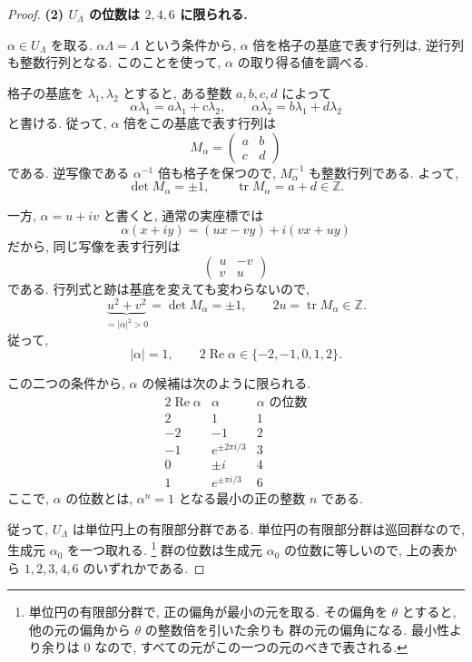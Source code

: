 \documentclass[dvipdfmx,a4paper,11pt]{article} %
\newcommand{\Z}{\mathbb{Z}}
\theoremstyle{definition}
\numberwithin{equation}{section}
\begin{document}
\begin{proof}
\medskip
\noindent
\textbf{(2) $U_\Lambda$ の位数は $2,4,6$ に限られる.}

$\alpha\in U_\Lambda$ を取る.
$\alpha\Lambda=\Lambda$ という条件から,
$\alpha$ 倍を格子の基底で表す行列は,
逆行列も整数行列となる.
このことを使って, $\alpha$ の取り得る値を調べる.

格子の基底を $\lambda_1,\lambda_2$ とすると,
ある整数 $a,b,c,d$ によって
\[
\alpha\lambda_1=a\lambda_1+c\lambda_2,\qquad
\alpha\lambda_2=b\lambda_1+d\lambda_2
\]
と書ける.
従って, $\alpha$ 倍をこの基底で表す行列は
\[
M_\alpha=
\begin{pmatrix}
a&b\\
c&d
\end{pmatrix}
\]
である.
逆写像である $\alpha^{-1}$ 倍も格子を保つので,
$M_\alpha^{-1}$ も整数行列である.
よって,
\[
\det M_\alpha=\pm1,\qquad
\operatorname{tr}M_\alpha=a+d\in\Z.
\]

一方, $\alpha=u+iv$ と書くと,
通常の実座標では
\[
\alpha(x+iy)=(ux-vy)+i(vx+uy)
\]
だから, 同じ写像を表す行列は
\[
\begin{pmatrix}
u&-v\\
v&u
\end{pmatrix}
\]
である.
行列式と跡は基底を変えても変わらないので,
\[
\underbrace{u^2+v^2}_{=|\alpha|^2>0}
=\det M_\alpha=\pm1,
\qquad
2u=\operatorname{tr}M_\alpha\in\Z.
\]
従って,
\[
|\alpha|=1,\qquad
2\operatorname{Re}\alpha\in\{-2,-1,0,1,2\}.
\]

この二つの条件から, $\alpha$ の候補は次のように限られる.
\[
\begin{array}{c|c|c}
2\operatorname{Re}\alpha & \alpha & \alpha\text{ の位数}\\ \hline
2  & 1 & 1\\
-2 & -1 & 2\\
-1 & e^{\pm2\pi i/3} & 3\\
0  & \pm i & 4\\
1  & e^{\pm\pi i/3} & 6
\end{array}
\]
ここで, $\alpha$ の位数とは,
$\alpha^n=1$ となる最小の正の整数 $n$ である.

従って, $U_\Lambda$ は単位円上の有限部分群である.
単位円の有限部分群は巡回群なので,
生成元 $\alpha_0$ を一つ取れる.
\footnote{
単位円の有限部分群で, 正の偏角が最小の元を取る.
その偏角を $\theta$ とすると,
他の元の偏角から $\theta$ の整数倍を引いた余りも
群の元の偏角になる.
最小性より余りは $0$ なので,
すべての元がこの一つの元のべきで表される.
}
群の位数は生成元 $\alpha_0$ の位数に等しいので,
上の表から $1,2,3,4,6$ のいずれかである.


\end{proof}
\end{document}
